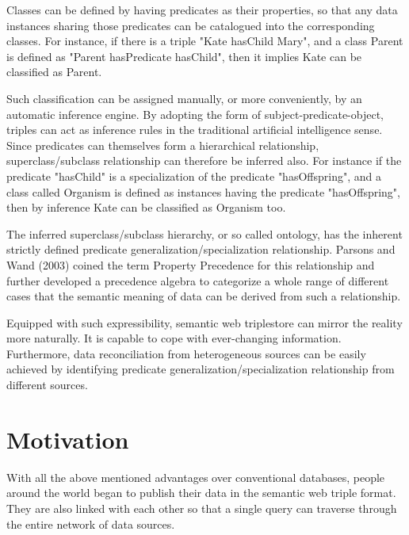 \documentclass[12pt]{cls}
\begin{document}
Classes can be defined by having predicates as their properties, so that any data instances sharing those predicates can be catalogued into the corresponding classes. For instance, if there is a triple "Kate hasChild Mary", and a class Parent is defined as "Parent hasPredicate hasChild", then it implies Kate can be classified as Parent.

Such classification can be assigned manually, or more conveniently, by an automatic inference engine. By adopting the form of subject-predicate-object, triples can act as inference rules in the traditional artificial intelligence sense. Since predicates can themselves form a hierarchical relationship, superclass/subclass relationship can therefore be inferred also. For instance if the predicate "hasChild" is a specialization of the predicate "hasOffspring", and a class called Organism is defined as instances having the predicate "hasOffspring", then by inference Kate can be classified as Organism too.

The inferred superclass/subclass hierarchy, or so called ontology, has the inherent strictly defined predicate generalization/specialization relationship. Parsons and Wand (2003) coined the term Property Precedence for this relationship and further developed a precedence algebra to categorize a whole range of different cases that the semantic meaning of data can be derived from such a relationship.

Equipped with such expressibility, semantic web triplestore can mirror the reality more naturally. It is capable to cope with ever-changing information. Furthermore, data reconciliation from heterogeneous sources can be easily achieved by identifying predicate generalization/specialization relationship from different sources.

\section{Motivation}

With all the above mentioned advantages over conventional databases, people around the world began to publish their data in the semantic web triple format. They are also linked with each other so that a single query can traverse through the entire network of data sources.
\end{document}
